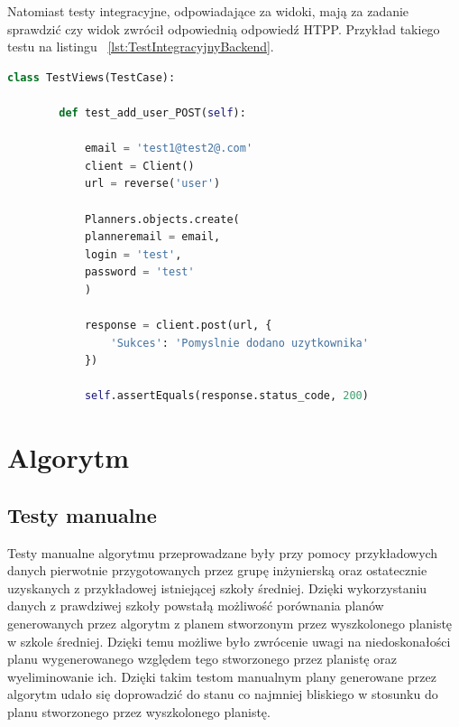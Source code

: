 Natomiast testy integracyjne, odpowiadające za widoki, mają za zadanie sprawdzić czy widok zwrócił odpowiednią odpowiedź HTPP. Przykład takiego testu na listingu ~\ref{lst:TestIntegracyjnyBackend}.

\begin{lstlisting}[language=Python, caption=Implementacja przykładowego testu integracyjnego, label={lst:TestIntegracyjnyBackend}]
	class TestViews(TestCase):
	
		def test_add_user_POST(self):
	
			email = 'test1@test2@.com'
			client = Client()
			url = reverse('user')
			
			Planners.objects.create(
			planneremail = email,
			login = 'test',
			password = 'test'
			)
			
			response = client.post(url, {
				'Sukces': 'Pomyslnie dodano uzytkownika'
			})
			
			self.assertEquals(response.status_code, 200)
\end{lstlisting}


\section{Algorytm}
	\subsection{Testy manualne}
	Testy manualne algorytmu przeprowadzane były przy pomocy przykładowych danych pierwotnie przygotowanych przez grupę inżynierską oraz ostatecznie uzyskanych z przykładowej istniejącej szkoły średniej. Dzięki wykorzystaniu danych z prawdziwej szkoły powstałą możliwość porównania planów generowanych przez algorytm z planem stworzonym przez wyszkolonego planistę w szkole średniej.	Dzięki temu możliwe było zwrócenie uwagi na niedoskonałości planu wygenerowanego względem tego stworzonego przez planistę oraz wyeliminowanie ich. Dzięki takim testom manualnym plany generowane przez algorytm udało się doprowadzić do stanu co najmniej bliskiego w stosunku do planu stworzonego przez wyszkolonego planistę.
	
